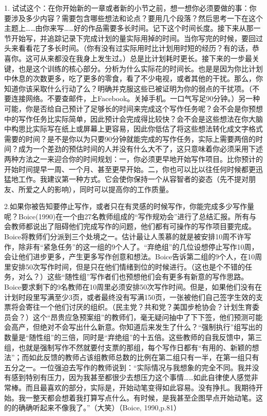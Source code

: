 \documentclass{ctexart}
\begin{document}
1. 试试这个：在你开始新的一章或者新的小节之前，想一想你必须要做的事：你要涉及多少内容？需要包含哪些想法和论点？要用几个段落？然后思考一下在这个主题上……由你来写……好的作品需要多长时间。记下这个时间长度。接下来从那一节开始写，并追踪记录下完成计划的量实际用掉的时间。当你写完的时候，要回过头来看看花了多长时间。（你有没有过实际用时比计划用时短的经历？有的话，恭喜你。这可从来都没在我身上发生过。）总是比计划耗时更长。接下来的一步最关键，也是这个训练的核心部分。分析为什么实际花的时间长。也是是因为你比计划中休息的次数更多，吃了更多的零食，看了不少电视，或者其他的干扰。那么，你知道你该采取什么行动了么？明确并克服这些已被证明为你的弱点的干扰项。（不要连接网络。不要查邮件，上Facebook。关掉手机。一口气写足90分钟。）另一种可能，你是否给自己预计了足够长的时间来完成这个写作任务呢？会不会是你预想中的写作任务比实际简单，因此预计会完成得比较快？会不会是这些想法在你大脑中构思比实际写在纸上或屏幕上更容易，因此你低估了将这些想法转化成文字格式需要的时间？是不是你以为只要90分钟就能完成的写作任务，实际上需要两倍的时间？成为一个差劲的预估时间的人并没有什么大不了，这只意味着你必须采用下述两种方法之一来迎合你的时间规划：一，你必须更早地开始写作项目。比你预计的开始时间提早一周、一个月、甚至更早开始。二，你也可以比以往任何时候都更迅猛地工作。我建议第一种方式。它会使你保持一个从容智者的姿态（先不提对朋友、所爱之人的影响），同时可以提高你的工作质量。

2.如果你被告知要停止写作，或者只在有灵感的时候写作，你能完成多少写作量呢？Boice(1990)在一个由27名教师组成的“写作规劝会”进行了总结汇报。所有与会教师都说出了阻碍他们完成写作的问题，他们都有可操作的写作项目要完成。Boice将教师们分派到三个处境之一。估计最让人羡慕的就是被安排10周不许写作，除非有“紧急任务”的这一组的9个人了。“弃绝组”的几位设想停止写作10周，会让他们进步更多，产生更多写作创意和想法。Boice告诉第二组的9个人，在10周里安排50次写作时间，但是只在他们情绪到位的时候进行。（这也是个不错的任务，对么？）这些“随性组”写作者们也预想他们会有更多有新意的写作思路。Boice要求剩下的9名教师在10周里必须安排50次写作时间。但是，如果他们没有在计划时段里写满至少3页，或者最终没有写满150页，一张被他们自己签字生效的支票将会寄往一个他们讨厌的组织。（民主党？共和党？美国步枪协会？计划生育委员会？）这个“昂贵应急预案组”的教师们，毫无疑问抽中了下下签，他们预测可能会高产，但绝对不会写出什么新意。你知道后来发生了什么？“强制执行”组写出的数量是“随性组”的三倍，同时是“弃绝组”的十五倍。这些教师的自我反馈中，第三组，也就是强制写作不然就要付支票的那组，每个写作日都有“有用的、新颖的想法”；而如此反馈的教师占该组教师总数的比例在第二组只有一半，在第一组只有五分之一。一位强迫去写作的教师说到：“实际情况与我想象的完全不同。我并没有感到特别有压力，因为我甚至都很少去想压力这个事情……如此自律使人感觉非常棒。而且最喜欢的部分，实际是，开始动笔变得如此容易。没有挣扎。我期待开始。我一整天都会想着我打算写点什么。有时候，是我甚至企图早点开始动笔。这的的确确听起来不像我了。”（大笑）（Boice, 1990,p.81）
\end{document}
